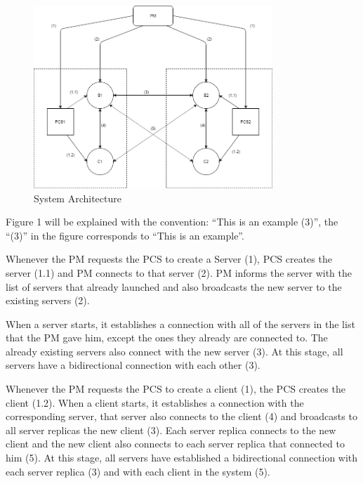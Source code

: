 \documentclass[times, 10pt, twocolumn]{article}
\begin{document}
\begin{figure}[h!]
\centering
\includegraphics[width=90mm]{fault-tolerance}
\caption{System Architecture}
\label{fig:method}
\end{figure}


Figure 1 will be explained with the convention: “This is an example (3)”, the “(3)” in the figure corresponds to “This is an example”.


Whenever the PM requests the PCS to create a Server (1), PCS creates the server (1.1) and PM connects to that server (2). PM informs the server with the list of servers that already launched and also broadcasts the new server to the existing servers (2).

When a server starts, it establishes a connection with all of the servers in the list that the PM gave him, except the ones they already are connected to. The already existing servers also connect with the new server (3). At this stage, all servers have a bidirectional connection with each other (3). 

Whenever the PM requests the PCS to create a client (1), the PCS creates the client (1.2).
When a client starts, it establishes a connection with the corresponding server, that server also connects to the client (4) and broadcasts to all server replicas the new client (3). Each server replica connects to the new client and the new client also connects to each server replica that connected to him (5). At this stage, all servers have established a bidirectional connection with each server replica (3) and with each client in the system (5).
\end{document}
